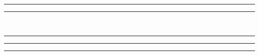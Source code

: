 \begin{titlepage}
    \centering
    
    \rule{\textwidth}{1pt}
    \vspace{2pt}\vspace{-\baselineskip}
    \rule{\textwidth}{0.4pt}
    \vspace{0.1\textheight}
    
    \textcolor{Red}
    {
    	{\Huge {\thetitle}}\\[0.5\baselineskip]
    }
    
    \vspace{0.025\textheight}
    \rule{0.3\textwidth}{0.4pt}
    
    \vspace{0.1\textheight}
    {\Large \textsc{\theauthor}}
    
    \vfill
    {\large\textsc{\thedate}}
    \vspace{0.1\textheight}
    
    \rule{\textwidth}{0.4pt}
    \vspace{2pt}\vspace{-\baselineskip}
    \rule{\textwidth}{1pt}

\end{titlepage}